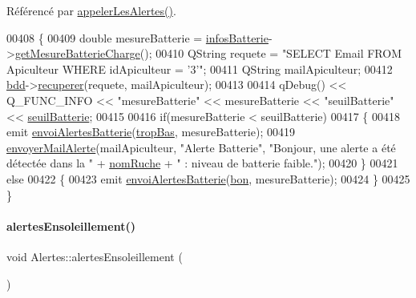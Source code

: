 Référencé par \hyperlink{class_alertes_ad04a02dcc6e6f14da0784c7054888b05}{appeler\+Les\+Alertes()}.


\begin{DoxyCode}
00408 \{
00409     \textcolor{keywordtype}{double} mesureBatterie = \hyperlink{class_alertes_ad5c756a52ff4d6ae85cc0f03bd80582b}{infosBatterie}->\hyperlink{class_infos_batterie_a8c37174d0d36e4f5ada9d16dd5894803}{getMesureBatterieCharge}();
00410     QString requete = \textcolor{stringliteral}{"SELECT Email FROM Apiculteur WHERE idApiculteur = '3'"};
00411     QString mailApiculteur;
00412     \hyperlink{class_alertes_a91e58b69d29922e8e984efb767ae5268}{bdd}->\hyperlink{class_base_de_donnees_a77539baad389f5acf754cd2cd452403e}{recuperer}(requete, mailApiculteur);
00413 
00414     qDebug() << Q\_FUNC\_INFO << \textcolor{stringliteral}{"mesureBatterie"} << mesureBatterie << \textcolor{stringliteral}{"seuilBatterie"} << 
      \hyperlink{class_alertes_a3ac4e5d2b1a8fdd9cf4633861948110f}{seuilBatterie};
00415 
00416     \textcolor{keywordflow}{if}(mesureBatterie < seuilBatterie)
00417     \{
00418         emit \hyperlink{class_alertes_a0e81d795f8e7559eab19fcb9be138f5f}{envoiAlertesBatterie}(\hyperlink{parametres_8h_aaa6de8207c94675264c90b10b613368da4257e2f8921856770c8266f55c937295}{tropBas}, mesureBatterie);
00419         \hyperlink{class_alertes_a375783502a78109f3323dc1ed90cfdc9}{envoyerMailAlerte}(mailApiculteur, \textcolor{stringliteral}{"Alerte Batterie"}, \textcolor{stringliteral}{"Bonjour, une alerte a été
       détectée dans la "}  + \hyperlink{class_alertes_a212f2a7185bcc7b11f3e54200272bdcf}{nomRuche} +  \textcolor{stringliteral}{" : niveau de batterie faible."});
00420     \}
00421     \textcolor{keywordflow}{else}
00422     \{
00423         emit \hyperlink{class_alertes_a0e81d795f8e7559eab19fcb9be138f5f}{envoiAlertesBatterie}(\hyperlink{parametres_8h_aaa6de8207c94675264c90b10b613368da5ac8ec3b54d90a07c6bb5a77ef971821}{bon}, mesureBatterie);
00424     \}
00425 \}
\end{DoxyCode}
\mbox{\label{class_alertes_ae7ad960c530a6a7e82df3ed55d159a68}} 
\paragraph{\texorpdfstring{alertes\+Ensoleillement()}{alertesEnsoleillement()}}
{\footnotesize\ttfamily void Alertes\+::alertes\+Ensoleillement (\begin{DoxyParamCaption}{ }\end{DoxyParamCaption})}

